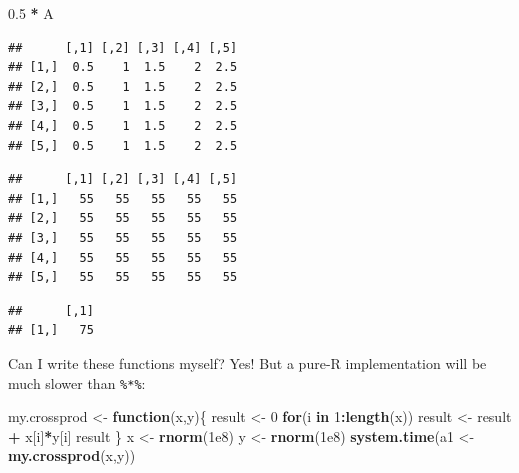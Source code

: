 \documentclass[]{book}
\newenvironment{Shaded}{\begin{snugshade}}{\end{snugshade}}
\newcommand{\KeywordTok}[1]{\textcolor[rgb]{0.13,0.29,0.53}{\textbf{#1}}}
\newcommand{\DecValTok}[1]{\textcolor[rgb]{0.00,0.00,0.81}{#1}}
\newcommand{\FloatTok}[1]{\textcolor[rgb]{0.00,0.00,0.81}{#1}}
\newcommand{\StringTok}[1]{\textcolor[rgb]{0.31,0.60,0.02}{#1}}
\newcommand{\CommentTok}[1]{\textcolor[rgb]{0.56,0.35,0.01}{\textit{#1}}}
\newcommand{\ControlFlowTok}[1]{\textcolor[rgb]{0.13,0.29,0.53}{\textbf{#1}}}
\newcommand{\OperatorTok}[1]{\textcolor[rgb]{0.81,0.36,0.00}{\textbf{#1}}}
\newcommand{\NormalTok}[1]{#1}
\theoremstyle{definition}
\theoremstyle{definition}
\theoremstyle{definition}
\theoremstyle{remark}
\begin{document}
\begin{Shaded}
\begin{Highlighting}[]
\FloatTok{0.5} \OperatorTok{*}\StringTok{ }\NormalTok{A }
\end{Highlighting}
\end{Shaded}

\begin{verbatim}
##      [,1] [,2] [,3] [,4] [,5]
## [1,]  0.5    1  1.5    2  2.5
## [2,]  0.5    1  1.5    2  2.5
## [3,]  0.5    1  1.5    2  2.5
## [4,]  0.5    1  1.5    2  2.5
## [5,]  0.5    1  1.5    2  2.5
\end{verbatim}

\begin{Shaded}
\end{Shaded}

\begin{verbatim}
##      [,1] [,2] [,3] [,4] [,5]
## [1,]   55   55   55   55   55
## [2,]   55   55   55   55   55
## [3,]   55   55   55   55   55
## [4,]   55   55   55   55   55
## [5,]   55   55   55   55   55
\end{verbatim}

\begin{Shaded}
\end{Shaded}

\begin{verbatim}
##      [,1]
## [1,]   75
\end{verbatim}

Can I write these functions myself? Yes! But a pure-R implementation
will be much slower than \texttt{\%*\%}:

\begin{Shaded}
\begin{Highlighting}[]
\NormalTok{my.crossprod <-}\StringTok{ }\ControlFlowTok{function}\NormalTok{(x,y)\{}
\NormalTok{  result <-}\StringTok{ }\DecValTok{0}
  \ControlFlowTok{for}\NormalTok{(i }\ControlFlowTok{in} \DecValTok{1}\OperatorTok{:}\KeywordTok{length}\NormalTok{(x)) result <-}\StringTok{ }\NormalTok{result }\OperatorTok{+}\StringTok{ }\NormalTok{x[i]}\OperatorTok{*}\NormalTok{y[i]}
\NormalTok{  result}
\NormalTok{\}}
\NormalTok{x <-}\StringTok{ }\KeywordTok{rnorm}\NormalTok{(}\FloatTok{1e8}\NormalTok{)}
\NormalTok{y <-}\StringTok{ }\KeywordTok{rnorm}\NormalTok{(}\FloatTok{1e8}\NormalTok{)}
\KeywordTok{system.time}\NormalTok{(a1 <-}\StringTok{ }\KeywordTok{my.crossprod}\NormalTok{(x,y))}
\end{Highlighting}
\end{Shaded}
\end{document}
